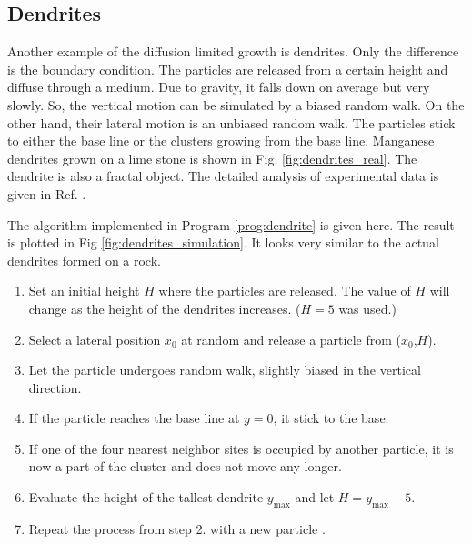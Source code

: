 \noindent
\subsection{Dendrites}

Another example of the diffusion limited growth is dendrites.
Only the difference is the boundary condition. The particles are released from a certain height and diffuse through a medium.  Due to gravity, it falls down on average but very slowly. So, the vertical motion can be simulated by a biased random walk. On the other hand, their lateral motion is an unbiased random walk.  The particles stick to either the base line or the clusters growing from the base line.
Manganese dendrites grown on a lime stone is shown in Fig. \ref{fig:dendrites_real}.  The dendrite is also a fractal object. The detailed analysis of experimental data is given in Ref. \cite{dendrite-experiment}.

The algorithm implemented in Program \ref{prog:dendrite} is given here.  The result is plotted in Fig \ref{fig:dendrites_simulation}.  It looks very similar to the actual dendrites formed on a rock.

\begin{myalgobox}
\label{al:dendrites}

\medskip
\begin{minipage}{5.5in}
\small
\begin{enumerate}
\item Set an initial height $H$ where the particles are released. The value of $H$ will change as the height of the dendrites increases. ($H=5$ was used.)
\item Select a lateral position $x_0$ at random and release a particle from ($x_0$,$H$).
\item Let the particle undergoes random walk, slightly biased in the vertical direction.
\item If the particle reaches the base line at $y=0$, it stick to the base.
\item If one of the four nearest neighbor sites is occupied by another particle, it is now  a part of the cluster and does not move any longer.
\item Evaluate the height of the tallest dendrite $y_\text{max}$ and let $H=y_\text{max}+5$.
\item Repeat the process from step 2. with a new particle .
\end{enumerate}
\end{minipage}
\end{myalgobox}



